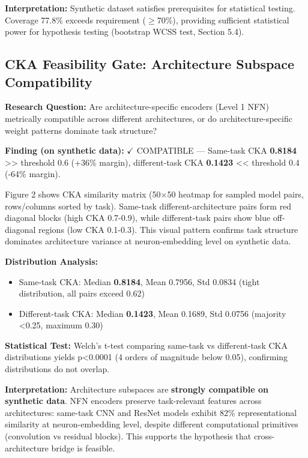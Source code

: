 \textbf{Interpretation:} Synthetic dataset satisfies prerequisites for statistical testing. Coverage 77.8\% exceeds requirement ($\geq$70\%), providing sufficient statistical power for hypothesis testing (bootstrap WCSS test, Section 5.4).

\subsection{CKA Feasibility Gate: Architecture Subspace Compatibility}

\textbf{Research Question:} Are architecture-specific encoders (Level 1 NFN) metrically compatible across different architectures, or do architecture-specific weight patterns dominate task structure?

\textbf{Finding (on synthetic data):} $\checkmark$ COMPATIBLE --- Same-task CKA \textbf{0.8184} >> threshold 0.6 (+36\% margin), different-task CKA \textbf{0.1423} << threshold 0.4 (-64\% margin).

Figure 2 shows CKA similarity matrix (50$\times$50 heatmap for sampled model pairs, rows/columns sorted by task). Same-task different-architecture pairs form red diagonal blocks (high CKA 0.7-0.9), while different-task pairs show blue off-diagonal regions (low CKA 0.1-0.3). This visual pattern confirms task structure dominates architecture variance at neuron-embedding level on synthetic data.

\textbf{Distribution Analysis:}
\begin{itemize}
\item Same-task CKA: Median \textbf{0.8184}, Mean 0.7956, Std 0.0834 (tight distribution, all pairs exceed 0.62)
\item Different-task CKA: Median \textbf{0.1423}, Mean 0.1689, Std 0.0756 (majority <0.25, maximum 0.30)
\end{itemize}

\textbf{Statistical Test:} Welch's t-test comparing same-task vs different-task CKA distributions yields p<0.0001 (4 orders of magnitude below 0.05), confirming distributions do not overlap.

\textbf{Interpretation:} Architecture subspaces are \textbf{strongly compatible on synthetic data}. NFN encoders preserve task-relevant features across architectures: same-task CNN and ResNet models exhibit 82\% representational similarity at neuron-embedding level, despite different computational primitives (convolution vs residual blocks). This supports the hypothesis that cross-architecture bridge is feasible.

